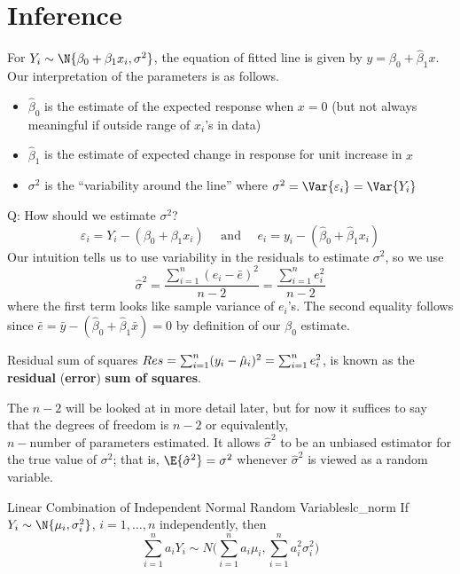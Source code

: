 \section{Inference}
For $ Y_i \sim \N{\beta_0+\beta_1x_i,\sigma^2} $,
the equation of fitted line
is given by $ y=\hat{\beta}_0+\hat{\beta}_1x $. Our
interpretation of the parameters is as follows.
\begin{itemize}
  \item $ \hat{\beta}_0 $ is the estimate
        of the expected response when $ x=0 $ (but not always
        meaningful if outside range of $ x_i $'s in data)
  \item $ \hat{\beta}_1 $ is the estimate of
        expected change in response for unit increase in $ x $
  \item $ \sigma^2 $ is the
        ``variability around the line''
        where $ \sigma^2=\Var{\varepsilon_i}=\Var{Y_i} $
\end{itemize}
Q\@: How should we estimate $ \sigma^2 $?
\[ \varepsilon_i=Y_i-(\beta_0+\beta_1x_i)
  \quad\text{ and }\quad e_i=y_i-(\hat{\beta}_0+\hat{\beta}_1x_i) \]
Our intuition tells us to use variability in the residuals to estimate
$ \sigma^2 $, so we use
\[ \hat{\sigma}^2
  =\frac{\sum_{i=1}^{n} (e_i-\bar{e})^2}{n-2}=
  \frac{\sum_{i=1}^{n} e_i^2}{n-2}  \]
where the first term looks like sample variance of $ e_i $'s.
The second equality follows since
$ \bar{e}=\bar{y}-(\hat{\beta}_0+\hat{\beta}_1\bar{x})=0 $
by definition of our $ \beta_0 $ estimate.
\begin{Definition}{Residual sum of squares}{}
  $ \relax{Res}=
    \sum_{i=1}^{n} (y_i-\hat{\mu}_i)^2=
    \sum_{i=1}^{n} e_i^2 $,
  is known as the \textbf{residual} (\textbf{error})
  \textbf{sum of squares}.
\end{Definition}
\begin{Remark}{}{}
  The $ n-2 $ will be looked at in more detail later, but for now
  it suffices to say that the degrees of freedom
  is $ n-2 $ or equivalently, $ n- \text{number of parameters
      estimated}$. It allows $ \hat{\sigma}^2 $ to be an unbiased estimator
  for the true value of $ \sigma^2 $; that is,
  $ \E{\hat{\sigma}^2}=\sigma^2 $
  whenever $ \hat{\sigma}^2 $ is viewed as a random variable.
\end{Remark}
\begin{Theorem}{Linear Combination of Independent Normal Random Variables}{lc_norm}
  If $ Y_i \sim \N{\mu_i,\sigma_i^2} $, $ i=1,\ldots,n $
  independently, then
  \[ \sum_{i=1}^{n} a_i Y_i \sim N
    \biggl( \sum_{i=1}^{n} a_i\mu_i,\sum_{i=1}^{n} a_i^2\sigma_i^2 \biggr) \]
\end{Theorem}
